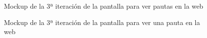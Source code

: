 \begin{figure}[H]
    \centering
    \caption[Mockup de la 3ª iteración de la pantalla para ver pautas en la web]{Mockup de la 3ª iteración de la pantalla para ver pautas en la web}
    \label{c4:fig:v3:web:verPautas}
\end{figure}

\begin{figure}[H]
    \centering
    \caption[Mockup de la 3ª iteración de la pantalla para ver una pauta en la web]{Mockup de la 3ª iteración de la pantalla para ver una pauta en la web}
    \label{c4:fig:v3:web:verPauta}
\end{figure}


